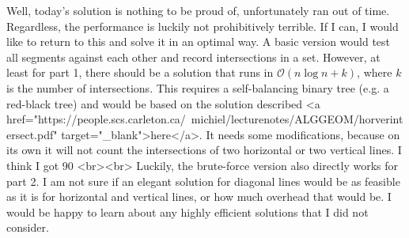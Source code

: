Well, today's solution is nothing to be proud of, unfortunately ran out of time. Regardless, the performance is luckily not prohibitively terrible. If I can, I would like to return to this and solve it in an optimal way. A basic version would test all segments against each other and record intersections in a set. However, at least for part 1, there should be a solution that runs in $\mathcal{O}(n \log n + k)$, where $k$ is the number of intersections. This requires a self-balancing binary tree (e.g. a red-black tree) and would be based on the solution described <a href="https://people.scs.carleton.ca/~michiel/lecturenotes/ALGGEOM/horverintersect.pdf" target="_blank">here</a>. It needs some modifications, because on its own it will not count the intersections of two horizontal or two vertical lines. I think I got 90%
<br><br>
Luckily, the brute-force version also directly works for part 2. I am not sure if an elegant solution for diagonal lines would be as feasible as it is for horizontal and vertical lines, or how much overhead that would be. I would be happy to learn about any highly efficient solutions that I did not consider.